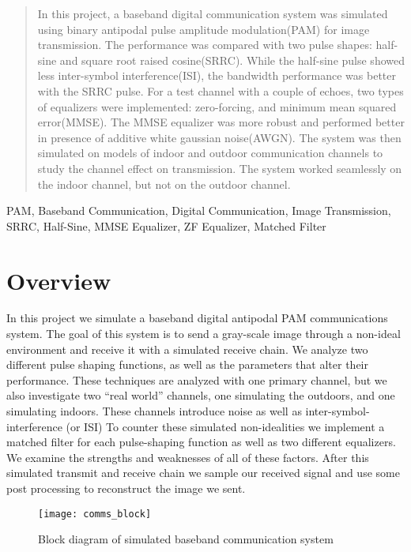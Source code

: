 \begin{abstract}
In this project, a baseband digital communication system was simulated using binary antipodal pulse amplitude modulation(PAM) for image transmission. The performance was compared with two pulse shapes: half-sine and square root raised cosine(SRRC). While the half-sine pulse showed less inter-symbol interference(ISI), the bandwidth performance was better with the SRRC pulse. For a test channel with a couple of echoes, two types of equalizers were implemented: zero-forcing, and minimum mean squared error(MMSE). The MMSE equalizer was more robust and performed better in presence of additive white gaussian noise(AWGN). The system was then simulated on models of indoor and outdoor communication channels to study the channel effect on transmission. The system worked seamlessly on the indoor channel, but not on the outdoor channel. 
\end{abstract}

\begin{IEEEkeywords}
PAM, Baseband Communication, Digital Communication, Image Transmission, SRRC, Half-Sine, MMSE Equalizer, ZF Equalizer, Matched Filter
\end{IEEEkeywords}

\section{Overview}
In this project we simulate a baseband digital antipodal PAM communications system. The goal of this system is to send a gray-scale image through a non-ideal environment and receive it with a simulated receive chain. We analyze two different pulse shaping functions, as well as the parameters that alter their performance. These techniques are analyzed with one primary channel, but we also investigate two “real world” channels, one simulating the outdoors, and one simulating indoors. These channels introduce noise as well as inter-symbol-interference (or ISI) To counter these simulated non-idealities we implement a matched filter for each pulse-shaping function as well as two different equalizers. We examine the strengths and weaknesses of all of these factors. After this simulated transmit and receive chain we sample our received signal and use some post processing to reconstruct the image we sent.

\begin{figure}
	\texttt{[image: comms\_block]}
	\caption{Block diagram of simulated baseband communication system}
	\label{block}
\end{figure}

